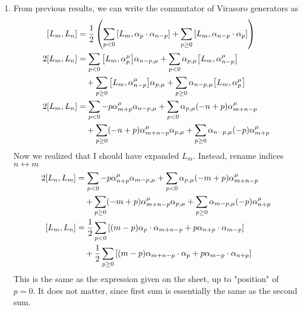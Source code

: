 \begin{enumerate}[label=(\alph*)]
	\item From previous results, we can write the commutator of Virasoro generators as
		\begin{align*}
			\comm{L_m}{L_n} &= \frac{1}{2} \left( \sum_{p<0} \comm{L_m}{\alpha_p \cdot \alpha_{n-p}} + \sum_{p \geq 0} \comm{L_m}{\alpha_{n-p} \cdot \alpha_{p}}\right) \\
			2 \comm{L_m}{L_n} &=  \sum_{p<0} \comm{L_m}{\alpha_p^\mu  } \alpha_{n-p, \mu} + \sum_{p<0} \alpha_{p, \mu} \comm{L_m}{\alpha_{n-p}^\mu} \\
									&\quad + \sum_{p \geq 0} \comm{L_m}{\alpha_{n-p}^\mu } \alpha_{p, \mu} + \sum_{p \geq 0} \alpha_{n-p, \mu}\comm{L_m}{ \alpha_{p}^\mu}\\
			2 \comm{L_m}{L_n} &=  \sum_{p<0} -p \alpha^\mu_{m + p} \alpha_{n-p, \mu} + \sum_{p<0} \alpha_{p, \mu} (-n+p) \alpha^\mu_{m+n-p} \\
									&\quad + \sum_{p \geq 0} (-n+p)\alpha_{m+n-p}^\mu \alpha_{p, \mu} + \sum_{p \geq 0} \alpha_{n-p, \mu} (-p) \alpha_{m+p}^\mu\\
		\end{align*}
		Now we realized that I should have expanded $L_m$. Instead, rename indices $n \leftrightarrow m$
		\begin{align*}
			2 \comm{L_n}{L_m} &=  \sum_{p<0} -p \alpha^\mu_{n + p} \alpha_{m-p, \mu} + \sum_{p<0} \alpha_{p, \mu} (-m+p) \alpha^\mu_{m+n-p} \\
									&\quad + \sum_{p \geq 0} (-m+p)\alpha_{m+n-p}^\mu \alpha_{p, \mu} + \sum_{p \geq 0} \alpha_{m-p, \mu} (-p) \alpha_{n+p}^\mu\\
			\comm{L_m}{L_n} &= \frac{1}{2} \sum_{p<0}\left[  (m-p) \alpha_{p} \cdot \alpha_{m+n-p} + p \alpha_{n + p} \cdot \alpha_{m-p}  \right]\\
								 &\quad + \frac{1}{2} \sum_{p \geq 0}\left[  (m-p)\alpha_{m+n-p} \cdot \alpha_{p} +  p \alpha_{m-p} \cdot \alpha_{n+p} \right] \\
		\end{align*}
		This is the same as the expression given on the sheet, up to "position" of $p=0$. It does not matter, since first sum is essentially the same as the second sum.


\end{enumerate}
